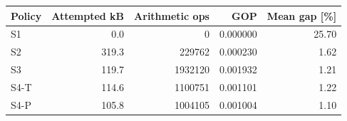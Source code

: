 \begin{tabular}{lrrrr}\toprule
Policy & Attempted kB & Arithmetic ops & GOP & Mean gap [\%]\\\midrule
S1 & 0.0 & 0 & 0.000000 & 25.70\\
S2 & 319.3 & 229762 & 0.000230 & 1.62\\
S3 & 119.7 & 1932120 & 0.001932 & 1.21\\
S4-T & 114.6 & 1100751 & 0.001101 & 1.22\\
S4-P & 105.8 & 1004105 & 0.001004 & 1.10\\
\bottomrule\end{tabular}
